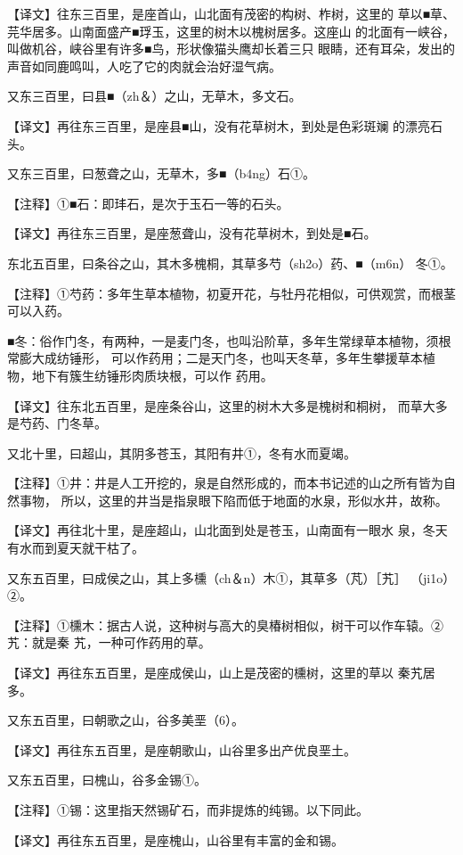 \documentclass[a4paper,12pt,UTF8,twoside]{ctexbook}
\begin{document}
【译文】往东三百里，是座首山，山北面有茂密的构树、柞树，这里的 草以■草、芫华居多。山南面盛产■琈玉，这里的树木以槐树居多。这座山 的北面有一峡谷，叫做机谷，峡谷里有许多■鸟，形状像猫头鹰却长着三只 眼睛，还有耳朵，发出的声音如同鹿鸣叫，人吃了它的肉就会治好湿气病。

又东三百里，曰县■（zh＆）之山，无草木，多文石。

【译文】再往东三百里，是座县■山，没有花草树木，到处是色彩斑斓 的漂亮石头。

又东三百里，曰葱聋之山，无草木，多■（b4ng）石①。

【注释】①■石：即玤石，是次于玉石一等的石头。

【译文】再往东三百里，是座葱聋山，没有花草树木，到处是■石。

东北五百里，曰条谷之山，其木多槐桐，其草多芍（sh2o）药、■（m6n） 冬①。

【注释】①芍药：多年生草本植物，初夏开花，与牡丹花相似，可供观赏，而根茎可以入药。

■冬：俗作门冬，有两种，一是麦门冬，也叫沿阶草，多年生常绿草本植物，须根常膨大成纺锤形， 可以作药用；二是天门冬，也叫天冬草，多年生攀援草本植物，地下有簇生纺锤形肉质块根，可以作 药用。

【译文】往东北五百里，是座条谷山，这里的树木大多是槐树和桐树， 而草大多是芍药、门冬草。

又北十里，曰超山，其阴多苍玉，其阳有井①，冬有水而夏竭。

【注释】①井：井是人工开挖的，泉是自然形成的，而本书记述的山之所有皆为自然事物， 所以，这里的井当是指泉眼下陷而低于地面的水泉，形似水井，故称。

【译文】再往北十里，是座超山，山北面到处是苍玉，山南面有一眼水 泉，冬天有水而到夏天就干枯了。

又东五百里，曰成侯之山，其上多櫄（ch＆n）木①，其草多（芃）［艽］ （ji1o）②。

【注释】①櫄木：据古人说，这种树与高大的臭椿树相似，树干可以作车辕。②艽：就是秦 艽，一种可作药用的草。

【译文】再往东五百里，是座成侯山，山上是茂密的櫄树，这里的草以 秦艽居多。

又东五百里，曰朝歌之山，谷多美垩（6）。

【译文】再往东五百里，是座朝歌山，山谷里多出产优良垩土。

又东五百里，曰槐山，谷多金锡①。

【注释】①锡：这里指天然锡矿石，而非提炼的纯锡。以下同此。

【译文】再往东五百里，是座槐山，山谷里有丰富的金和锡。
\end{document}

